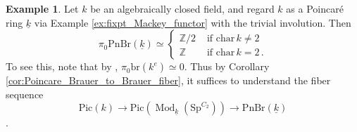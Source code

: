 \documentclass{article}
\DeclareMathOperator{\Mod}{Mod} %
\newcommand{\ZZ}{\mathbb{Z}}
\newcommand{\pnbr}{\ensuremath{\mathrm{PnBr}}}
\newcommand{\pic}{\ensuremath{\mathrm{Pic}}}
\theoremstyle{definition}
\newtheorem{example}[equation]{Example}
\begin{document}
\begin{example}\label{ex:pnbr_closed_point_ramified}
    Let $ k $ be an algebraically closed field, and regard $ k $ as a Poincar\'e ring $ \underline{k} $ via Example \ref{ex:fixpt_Mackey_functor} with the trivial involution.  
    Then 
    \begin{equation*}
        \pi_0\pnbr(\underline{k}) \simeq \begin{cases}
            \ZZ/2 & \text{ if }\mathrm{char}\, k \neq 2 \\
            \ZZ & \text{ if }\mathrm{char}\, k = 2 \,.
        \end{cases} 
    \end{equation*}
    To see this, note that by \cite[Proposition 1.9]{MR2957304}, $ \pi_0 \mathrm{br}(k^e) \simeq 0 $. 
    Thus by Corollary \ref{cor:Poincare_Brauer_to_Brauer_fiber}, it suffices to understand the fiber sequence \[\pic(k)\to \pic(\Mod_{\underline{k}}(\mathrm{Sp}^{C_2})) \to \pnbr(\underline{k})\]. 


\end{example}
\end{document}
